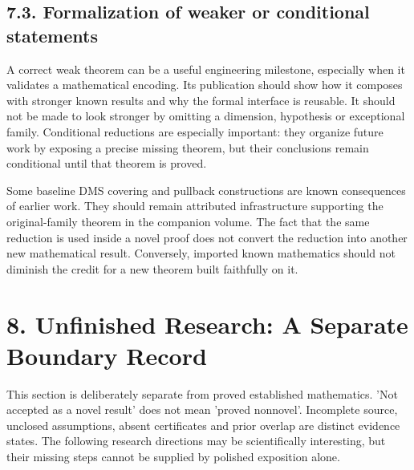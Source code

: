 \documentclass[11pt,a4paper]{article}
\begin{document}
\subsection{7.3. Formalization of weaker or conditional statements}
A correct weak theorem can be a useful engineering milestone, especially when it validates a mathematical encoding. Its publication should show how it composes with stronger known results and why the formal interface is reusable. It should not be made to look stronger by omitting a dimension, hypothesis or exceptional family. Conditional reductions are especially important: they organize future work by exposing a precise missing theorem, but their conclusions remain conditional until that theorem is proved.

Some baseline DMS covering and pullback constructions are known consequences of earlier work. They should remain attributed infrastructure supporting the original-family theorem in the companion volume. The fact that the same reduction is used inside a novel proof does not convert the reduction into another new mathematical result. Conversely, imported known mathematics should not diminish the credit for a new theorem built faithfully on it.

\section{8. Unfinished Research: A Separate Boundary Record}
This section is deliberately separate from proved established mathematics. 'Not accepted as a novel result' does not mean 'proved nonnovel'. Incomplete source, unclosed assumptions, absent certificates and prior overlap are distinct evidence states. The following research directions may be scientifically interesting, but their missing steps cannot be supplied by polished exposition alone.
\end{document}

